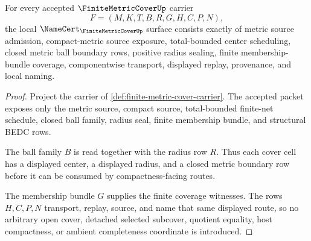 \begin{theorem}
\label{thm:finite-metric-cover-namecert-obligations}
For every accepted $\FiniteMetricCoverUp$ carrier
$$
F=(M,K,T,B,R,G,H,C,P,N),
$$
the local $\NameCert_{\FiniteMetricCoverUp}$ surface consists exactly of metric source admission, compact-metric source exposure, total-bounded center scheduling, closed metric ball boundary rows, positive radius sealing, finite membership-bundle coverage, componentwise transport, displayed replay, provenance, and local naming.
\end{theorem}
\begin{proof}
Project the carrier of \autoref{def:finite-metric-cover-carrier}. The accepted packet exposes only the metric source, compact source, total-bounded finite-net schedule, closed ball family, radius seal, finite membership bundle, and structural BEDC rows.

The ball family $B$ is read together with the radius row $R$. Thus each cover cell has a displayed center, a displayed radius, and a closed metric boundary row before it can be consumed by compactness-facing routes.

The membership bundle $G$ supplies the finite coverage witnesses. The rows $H,C,P,N$ transport, replay, source, and name that same displayed route, so no arbitrary open cover, detached selected subcover, quotient equality, host compactness, or ambient completeness coordinate is introduced.
\end{proof}

